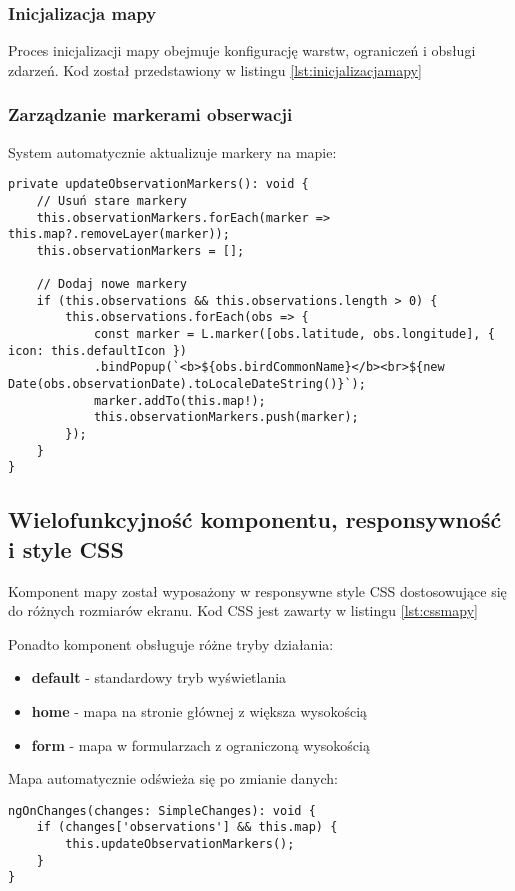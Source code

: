 \subsubsection{Inicjalizacja mapy}
Proces inicjalizacji mapy obejmuje konfigurację warstw, ograniczeń i obsługi zdarzeń.
Kod został przedstawiony w listingu \ref{lst:inicjalizacjamapy}

\subsubsection{Zarządzanie markerami obserwacji}
System automatycznie aktualizuje markery na mapie:

\begin{lstlisting}[style=tsstyle, caption={Parametry mapy}]
private updateObservationMarkers(): void {
	// Usuń stare markery
	this.observationMarkers.forEach(marker => this.map?.removeLayer(marker));
	this.observationMarkers = [];
	
	// Dodaj nowe markery
	if (this.observations && this.observations.length > 0) {
		this.observations.forEach(obs => {
			const marker = L.marker([obs.latitude, obs.longitude], { icon: this.defaultIcon })
			.bindPopup(`<b>${obs.birdCommonName}</b><br>${new Date(obs.observationDate).toLocaleDateString()}`);
			marker.addTo(this.map!);
			this.observationMarkers.push(marker);
		});
	}
}
\end{lstlisting}

\subsection{Wielofunkcyjność komponentu, responsywność i style CSS}
Komponent mapy został wyposażony w responsywne style CSS dostosowujące się do różnych rozmiarów ekranu. Kod CSS jest zawarty w listingu \ref{lst:cssmapy}

Ponadto komponent obsługuje różne tryby działania:
\begin{itemize}
	\item \textbf{default} - standardowy tryb wyświetlania
	\item \textbf{home} - mapa na stronie głównej z większa wysokością
	\item \textbf{form} - mapa w formularzach z ograniczoną wysokością
\end{itemize}

Mapa automatycznie odświeża się po zmianie danych:

\begin{lstlisting}[style=tsstyle, caption={Funkcja odświeżania mapy}]
ngOnChanges(changes: SimpleChanges): void {
	if (changes['observations'] && this.map) {
		this.updateObservationMarkers();
	}
}
\end{lstlisting}

